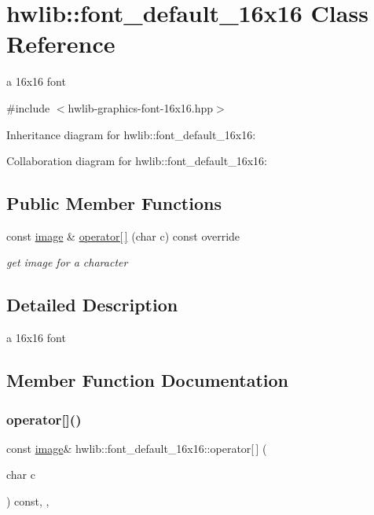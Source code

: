 \hypertarget{classhwlib_1_1font__default__16x16}{}\section{hwlib\+:\+:font\+\_\+default\+\_\+16x16 Class Reference}
\label{classhwlib_1_1font__default__16x16}


a 16x16 font  




{\ttfamily \#include $<$hwlib-\/graphics-\/font-\/16x16.\+hpp$>$}



Inheritance diagram for hwlib\+:\+:font\+\_\+default\+\_\+16x16\+:


Collaboration diagram for hwlib\+:\+:font\+\_\+default\+\_\+16x16\+:
\subsection*{Public Member Functions}
\begin{DoxyCompactItemize}
\item 
const \hyperlink{classhwlib_1_1image}{image} \& \hyperlink{classhwlib_1_1font__default__16x16_a0ad5e4c209117827ba854fb4e0a2717d}{operator\mbox{[}$\,$\mbox{]}} (char c) const override
\begin{DoxyCompactList}\small\item\em get image for a character \end{DoxyCompactList}\end{DoxyCompactItemize}


\subsection{Detailed Description}
a 16x16 font 

\subsection{Member Function Documentation}
\mbox{\label{classhwlib_1_1font__default__16x16_a0ad5e4c209117827ba854fb4e0a2717d}} 
\subsubsection{\texorpdfstring{operator[]()}{operator[]()}}
{\footnotesize\ttfamily const \hyperlink{classhwlib_1_1image}{image}\& hwlib\+::font\+\_\+default\+\_\+16x16\+::operator\mbox{[}$\,$\mbox{]} (\begin{DoxyParamCaption}\item[{char}]{c }\end{DoxyParamCaption}) const\hspace{0.3cm}{\ttfamily [inline]}, {\ttfamily [override]}, {\ttfamily [virtual]}}



